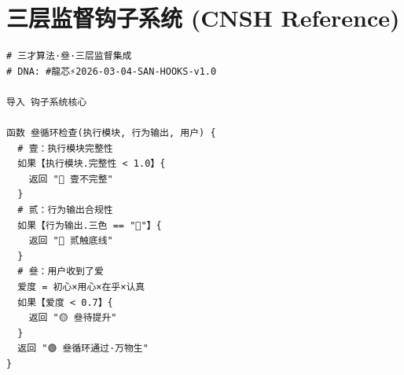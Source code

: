 \documentclass[conference]{IEEEtran}
\begin{document}
\section{三层监督钩子系统 (CNSH Reference)}

\begin{small}
\begin{verbatim}
# 三才算法·叄·三层监督集成
# DNA: #龍芯⚡️2026-03-04-SAN-HOOKS-v1.0

导入 钩子系统核心

函数 叄循环检查(执行模块, 行为输出, 用户) {
  # 壹：执行模块完整性
  如果【执行模块.完整性 < 1.0】{
    返回 "🔴 壹不完整"
  }
  # 贰：行为输出合规性
  如果【行为输出.三色 == "🔴"】{
    返回 "🔴 贰触底线"
  }
  # 叄：用户收到了爱
  爱度 = 初心×用心×在乎×认真
  如果【爱度 < 0.7】{
    返回 "🟡 叄待提升"
  }
  返回 "🟢 叄循环通过·万物生"
}
\end{verbatim}
\end{small}
\end{document}
